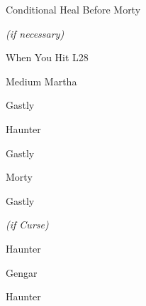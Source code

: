 \begin{paracol}{2}
\switchcolumn
\begin{menu}{Conditional Heal Before Morty}
	\varwb
	\begin{packMenu}
		\item \superPotion{} \textit{(if necessary)}
	\end{packMenu}
	\varwe
\end{menu}

\begin{misc}{When You Hit L28}
	\varwb
	\begin{notes}
		\item {}
	\end{notes}
	\varwe
\end{misc}

\switchcolumn
\begin{trainer}{Medium Martha}
	\varwb
	\begin{fightSection}{Gastly}
		\item {} \surf
	\end{fightSection}
	\begin{fightSection}{Haunter}
		\item {} \bite
		\item {} \waterGun
	\end{fightSection}
	\begin{fightSection}{Gastly}
		\item {} \surf
	\end{fightSection}
	\varwe
\end{trainer}

\begin{boss}{Morty}
	\varwb
	\begin{fightSection}{Gastly}
		\item \xSpeed
		\item \xSpecial
		\item \bossSwap{\textbf{(1)} \surf{} \switch{} \textbf{(4)} \waterGun}
		\item {} \bite{}
		\begin{notes}
			\small{\item {} \waterGun{} \textit{(if Curse)}}
		\end{notes}
	\end{fightSection}
	\begin{fightSection}{Haunter}
		\item {} \bite
	\end{fightSection}
	\begin{fightSection}{Gengar}
		\item {} \bite
		\item {} \surf
	\end{fightSection}
	\begin{fightSection}{Haunter}
		\item {} \surf
	\end{fightSection}
	\varwe
\end{boss}


\end{paracol}
